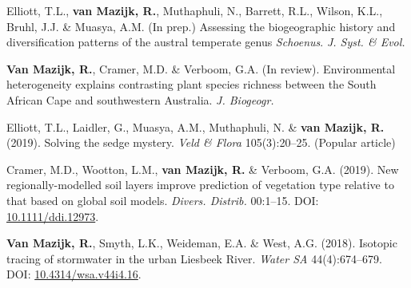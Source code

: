 \begin{hangparas}{2em}{1}

Elliott, T.L., \textbf{van Mazijk, R.}, Muthaphuli, N., Barrett, R.L., Wilson,
K.L., Bruhl, J.J. \& Muasya, A.M. (In prep.) Assessing the biogeographic history
and diversification patterns of the austral temperate genus \textit{Schoenus}.
\textit{J. Syst. \& Evol.}

\textbf{Van Mazijk, R.}, Cramer, M.D. \& Verboom, G.A. (In review).
Environmental heterogeneity explains contrasting plant species richness between
the South African Cape and southwestern Australia. \textit{J. Biogeogr.}

Elliott, T.L., Laidler, G., Muasya, A.M., Muthaphuli, N. \& \textbf{van Mazijk,
R.} (2019). Solving the sedge mystery. \textit{Veld \& Flora} 105(3):20--25.
(Popular article)

Cramer, M.D., Wootton, L.M., \textbf{van Mazijk, R.} \& Verboom, G.A. (2019).
New regionally-modelled soil layers improve prediction of vegetation type
relative to that based on global soil models. \textit{Divers. Distrib.}
00:1--15. DOI: \href{https://doi.org/10.1111/ddi.12973}{10.1111/ddi.12973}.

\textbf{Van Mazijk, R.}, Smyth, L.K., Weideman, E.A. \& West, A.G. (2018).
Isotopic tracing of stormwater in the urban Liesbeek River. \textit{Water SA}
44(4):674--679. DOI:
\href{https://doi.org/10.4314/wsa.v44i4.16}{10.4314/wsa.v44i4.16}.

\end{hangparas}
